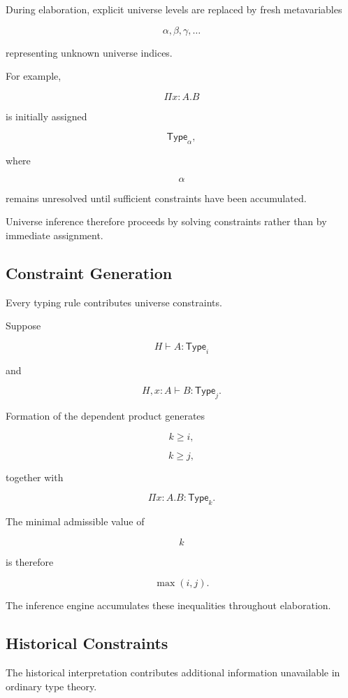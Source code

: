 \documentclass[12pt,oneside]{article}
\theoremstyle{definition}
\theoremstyle{remark}
\newcommand{\Type}{\mathsf{Type}}
\begin{document}
During elaboration, explicit universe levels are replaced by fresh metavariables

\[
\alpha,
\beta,
\gamma,
\ldots
\]

representing unknown universe indices.

For example,

\[
\Pi x:A.B
\]

is initially assigned

\[
\Type_\alpha,
\]

where

\[
\alpha
\]

remains unresolved until sufficient constraints have been accumulated.

Universe inference therefore proceeds by solving constraints rather than by
immediate assignment.


\subsection{Constraint Generation}

Every typing rule contributes universe constraints.

Suppose

\[
H
\vdash
A
:
\Type_i
\]

and

\[
H,x:A
\vdash
B
:
\Type_j.
\]

Formation of the dependent product generates

\[
k
\geq
i,
\]

\[
k
\geq
j,
\]

together with

\[
\Pi x:A.B
:
\Type_k.
\]

The minimal admissible value of

\[
k
\]

is therefore

\[
\max(i,j).
\]

The inference engine accumulates these inequalities throughout elaboration.


\subsection{Historical Constraints}

The historical interpretation contributes additional information unavailable in
ordinary type theory.
\end{document}
